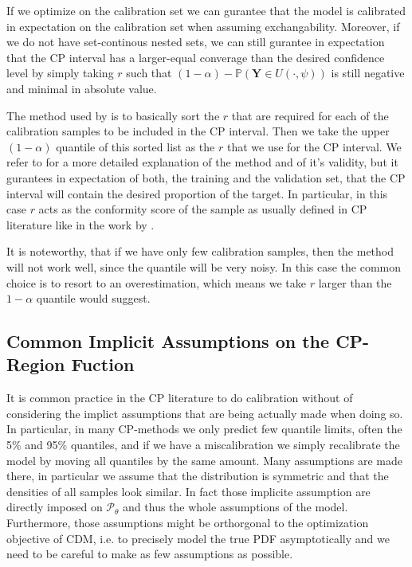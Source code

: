 If we optimize  on the calibration set we can gurantee that the model is calibrated in expectation on the calibration set when assuming exchangability. Moreover, if we do not have set-continous nested sets, we can still gurantee in expectation that the CP interval has a larger-equal converage than the desired confidence level by simply taking $r$ such that $(1 - \alpha) - \mathbb{P}(\mathbf{Y} \in U(\cdot, \psi))$ is still negative and minimal in absolute value.


The method used by \cite{sesia2021conformal, chernozhukov2021distributional} is to basically sort the $r$ that are required for each of the calibration samples to be included in the CP interval. Then we take the upper $(1- \alpha)$ quantile of this sorted list as the $r$ that we use for the CP interval. We refer to \cite{sesia2021conformal} for a more detailed explanation of the method and of it's validity, but it gurantees in expectation of both, the training and the validation set, that the CP interval will contain the desired proportion of the target. In particular, in this case $r$ acts as the conformity score of the sample as usually defined in CP literature like in the work by \cite{sesia2021conformal}.

It is noteworthy, that if we have only few calibration samples, then the method will not work well, since the quantile will be very noisy. In this case the common choice is to resort to an overestimation, which means we take $r$ larger than the $1-\alpha$ quantile would suggest.

\subsection{Common Implicit Assumptions on the CP-Region Fuction}\label{sec:implicit_assumptions_cp}

It is common practice in the CP literature to do calibration without of considering the implict assumptions that are being actually made when doing so. In particular, in many CP-methods we only predict few quantile limits, often the 5\% and 95\% quantiles, and if we have a miscalibration we simply recalibrate the model by moving all quantiles by the same amount. Many assumptions are made there, in particular we assume that the distribution is symmetric and that the densities of all samples look similar. In fact those implicite assumption are directly imposed on $\mathscr{P}_{\theta}$ and thus the whole assumptions of the model. Furthermore, those assumptions might be orthorgonal to the optimization objective of CDM, i.e. to precisely model the true PDF asymptotically and we need to be careful to make as few assumptions as possible.

